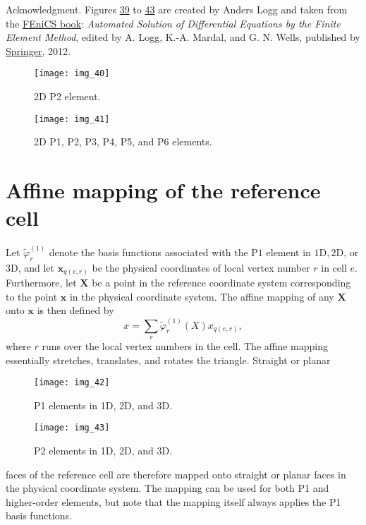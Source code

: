 \documentclass[../main.tex]{subfiles}
\begin{document}
	Acknowledgment. Figures \hyperref[fig:img_39]{39} to \hyperref[fig:img_43]{43} are created by Anders Logg and taken
	from the \href{https://launchpad.net/fenics-book}{FEniCS book}: \textit{Automated Solution of Differential Equations by the
		Finite Element Method}, edited by A. Logg, K.-A. Mardal, and G. N. Wells,
	published by \href{https://link.springer.com/book/10.1007/978-3-642-23099-8}{Springer}, 2012.
	\begin{figure}[H]
		\centering
		\texttt{[image: img\_40]}
		\caption{2D P2 element.}
		\label{fig:img_40}
	\end{figure}
	\begin{figure}[H]
		\centering
		\texttt{[image: img\_41]}
		\caption{2D P1, P2, P3, P4, P5, and P6 elements.}
		\label{fig:img_41}
	\end{figure}
	\section[Affine mapping of the reference cell]{Affine mapping of the reference cell}
	\label{sec:sec_9_3}
	\noindent Let $\tilde{\varphi}_{r}^{(1)}$ denote the basis functions associated with the $\mathrm{P} 1$ element in $1 \mathrm{D}, 2 \mathrm{D}$, or 3D, and let $\boldsymbol{x}_{q(e, r)}$ be the physical coordinates of local vertex number $r$ in cell $e$. Furthermore, let $\boldsymbol{X}$ be a point in the reference coordinate system corresponding to the point $\boldsymbol{x}$ in the physical coordinate system. The affine mapping of any $\boldsymbol{X}$ onto $\boldsymbol{x}$ is then defined by
	\begin{equation}\label{eqa112}
		x=\sum_{r} \tilde{\varphi}_{r}^{(1)}(X) x_{q(e, r)},
	\end{equation}
	where $r$ runs over the local vertex numbers in the cell. The affine mapping essentially stretches, translates, and rotates the triangle. Straight or planar
	\begin{figure}[H]
		\centering
		\texttt{[image: img\_42]}
		\caption{P1 elements in 1D, 2D, and 3D.}
		\label{fig:img_42}
	\end{figure}
	\begin{figure}[H]
		\centering
		\texttt{[image: img\_43]}
		\caption{P2 elements in 1D, 2D, and 3D.}
		\label{fig:img_43}
	\end{figure}
	
	\noindent faces of the reference cell are therefore mapped onto straight or planar faces
	in the physical coordinate system. The mapping can be used for both P1 and
	higher-order elements, but note that the mapping itself always applies the P1
	basis functions.
\end{document}
